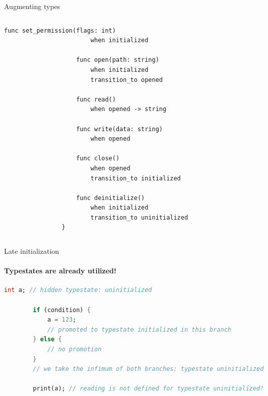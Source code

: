 \documentclass[compress,12pt,xcolor={dvipsnames}]{beamer}
\begin{document}
\begin{frame}[fragile]{Augmenting types}
\begin{columns}
\begin{column}{0.5\textwidth}
\begin{lstlisting}[language=TypeState,gobble=16,basicstyle=\tt\tiny]
                    func set_permission(flags: int)
                        when initialized
                    
                    func open(path: string)
                        when initialized
                        transition_to opened
                    
                    func read()
                        when opened -> string
                    
                    func write(data: string)
                        when opened
                    
                    func close()
                        when opened
                        transition_to initialized
                    
                    func deinitialize()
                        when initialized
                        transition_to uninitialized
                }
            \end{lstlisting}
        \end{column}
    \end{columns}
\end{frame}

\begin{frame}[fragile]{Late initialization}
    \framesubtitle{Typestates are already utilized!}
    \begin{lstlisting}[language=Dart,gobble=8,basicstyle=\tt\scriptsize]
        int a; // hidden typestate: uninitialized
        
        if (condition) {
            a = 123;
            // promoted to typestate initialized in this branch
        } else {
            // no promotion
        }
        // we take the infimum of both branches: typestate uninitialized
        
        print(a); // reading is not defined for typestate uninitialized!
    \end{lstlisting}
\end{frame}
\end{document}
